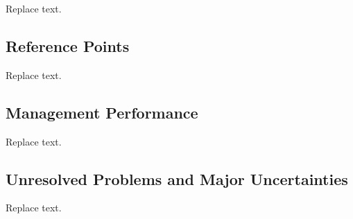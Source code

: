 \documentclass[11pt,
  english,
  a4paper,
]{article}
\begin{document}
\leavevmode\tagmcend\tagstructend


Replace text.

\leavevmode\tagmcend\tagstructend\par


\hypertarget{reference-points}{%
\subsection*{Reference Points}\label{reference-points}}

\leavevmode\tagmcend\tagstructend


Replace text.

\leavevmode\tagmcend\tagstructend\par


\hypertarget{management-performance}{%
\subsection*{Management Performance}\label{management-performance}}

\leavevmode\tagmcend\tagstructend


Replace text.

\leavevmode\tagmcend\tagstructend\par


\hypertarget{unresolved-problems-and-major-uncertainties}{%
\subsection*{Unresolved Problems and Major Uncertainties}\label{unresolved-problems-and-major-uncertainties}}

\leavevmode\tagmcend\tagstructend


Replace text.
\end{document}
